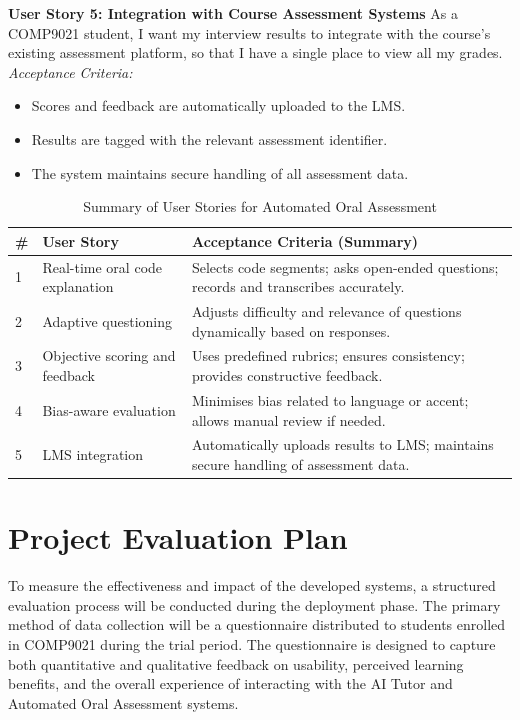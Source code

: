 \textbf{User Story 5: Integration with Course Assessment Systems}  
As a COMP9021 student, I want my interview results to integrate with the course’s existing assessment platform, so that I have a single place to view all my grades.  
\textit{Acceptance Criteria:}
\begin{itemize}
    \item Scores and feedback are automatically uploaded to the LMS.
    \item Results are tagged with the relevant assessment identifier.
    \item The system maintains secure handling of all assessment data.
\end{itemize}

\begin{table}[h]
\centering
\caption{Summary of User Stories for Automated Oral Assessment}
\label{tab:userstories_oral}
\renewcommand{\arraystretch}{1.2}
\begin{tabular}{p{0.8cm} p{6cm} p{6cm}}
\toprule
\textbf{\#} & \textbf{User Story} & \textbf{Acceptance Criteria (Summary)} \\
\midrule
1 & Real-time oral code explanation & Selects code segments; asks open-ended questions; records and transcribes accurately. \\
2 & Adaptive questioning & Adjusts difficulty and relevance of questions dynamically based on responses. \\
3 & Objective scoring and feedback & Uses predefined rubrics; ensures consistency; provides constructive feedback. \\
4 & Bias-aware evaluation & Minimises bias related to language or accent; allows manual review if needed. \\
5 & LMS integration & Automatically uploads results to LMS; maintains secure handling of assessment data. \\
\bottomrule
\end{tabular}
\end{table}

\section{Project Evaluation Plan}

To measure the effectiveness and impact of the developed systems, a structured evaluation process will be conducted during the deployment phase. The primary method of data collection will be a questionnaire distributed to students enrolled in COMP9021 during the trial period. The questionnaire is designed to capture both quantitative and qualitative feedback on usability, perceived learning benefits, and the overall experience of interacting with the AI Tutor and Automated Oral Assessment systems.

